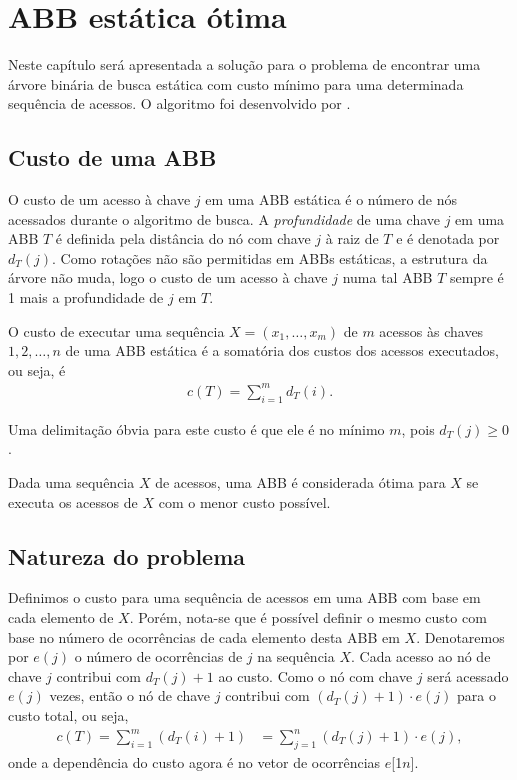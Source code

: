 
\chapter{ABB estática ótima}
\label{cap:abb-estatica-otima}

Neste capítulo será apresentada a solução para o problema de encontrar uma árvore binária de busca estática com custo mínimo para uma determinada sequência de acessos. O algoritmo foi desenvolvido por \cite{knuth}.

\section{Custo de uma ABB}

O custo de um acesso à chave $j$ em uma ABB estática é o número de nós acessados durante o algoritmo de busca. A \textit{profundidade} de uma chave $j$ em uma ABB $T$ é definida pela distância do nó com chave $j$ à raiz de $T$ e é denotada por $d_T(j)$. Como rotações não são permitidas em ABBs estáticas, a estrutura da árvore não muda, logo o custo de um acesso à chave $j$ numa tal ABB $T$ sempre é 1 mais a profundidade de $j$ em $T$.

O custo de executar uma sequência $X = (x_{1},\ldots,x_{m})$ de $m$ acessos às chaves $1, 2,\ldots,n$ de uma ABB estática é a somatória dos custos dos acessos executados, ou seja, é
\begin{align*}
c(T) = \sum_{i=1}^{m} d_T(i).
\end{align*}

Uma delimitação óbvia para este custo é que ele é no mínimo $m$, pois $d_T(j) \geq 0$.

Dada uma sequência $X$ de acessos, uma ABB é considerada ótima para $X$ se executa os acessos de $X$ com o menor custo possível.

\section{Natureza do problema}

Definimos o custo para uma sequência de acessos em uma ABB com base em cada elemento de $X$. Porém, nota-se que é possível definir o mesmo custo com base no número de ocorrências de cada elemento desta ABB em $X$. Denotaremos por $e(j)$ o número de ocorrências de $j$ na sequência $X$.
Cada acesso ao nó de chave $j$ contribui com $d_T(j) + 1$ ao custo. Como o nó com chave $j$ será acessado $e(j)$ vezes, então o nó de chave $j$ contribui com $(d_T(j) + 1)  \cdot e(j)$ para o custo total, ou seja,
\begin{align*}
c(T) = \sum_{i=1}^{m} (d_T(i) + 1) &= \sum_{j=1}^{n} (d_T(j) + 1) \cdot e(j),
\end{align*}
onde a dependência do custo agora é no vetor de ocorrências $e$[1\tdots$n$].

